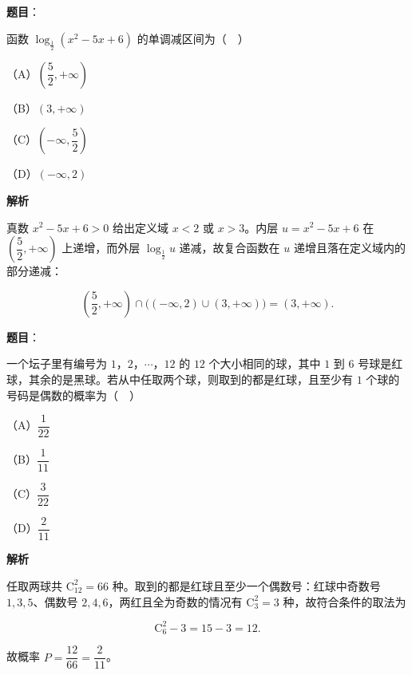 \begin{answer}

\textbf{题目}：

函数 $\log_{\frac12}(x^2-5x+6)$ 的单调减区间为（　）

（A）$\left(\dfrac52,+\infty\right)$

（B）$(3,+\infty)$

（C）$\left(-\infty,\dfrac52\right)$

（D）$(-\infty,2)$

\textbf{解析}

真数 $x^2-5x+6>0$ 给出定义域 $x<2$ 或 $x>3$。内层 $u=x^2-5x+6$ 在 $\left(\dfrac52,+\infty\right)$ 上递增，而外层 $\log_{\frac12}u$ 递减，故复合函数在 $u$ 递增且落在定义域内的部分递减：

\nopagebreak[4]
\[\left(\frac52,+\infty\right)\cap\bigl((-\infty,2)\cup(3,+\infty)\bigr)=(3,+\infty).\]


\end{answer}
\begin{answer}

\textbf{题目}：

一个坛子里有编号为 $1$，$2$，$\cdots$，$12$ 的 $12$ 个大小相同的球，其中 $1$ 到 $6$ 号球是红球，其余的是黑球。若从中任取两个球，则取到的都是红球，且至少有 $1$ 个球的号码是偶数的概率为（　）

（A）$\dfrac1{22}$

（B）$\dfrac1{11}$

（C）$\dfrac3{22}$

（D）$\dfrac2{11}$

\textbf{解析}

任取两球共 $\mathrm C_{12}^2=66$ 种。取到的都是红球且至少一个偶数号：红球中奇数号 $1,3,5$、偶数号 $2,4,6$，两红且全为奇数的情况有 $\mathrm C_3^2=3$ 种，故符合条件的取法为

\nopagebreak[4]
\[\mathrm C_6^2-3=15-3=12.\]

故概率 $P=\dfrac{12}{66}=\dfrac2{11}$。


\end{answer}
